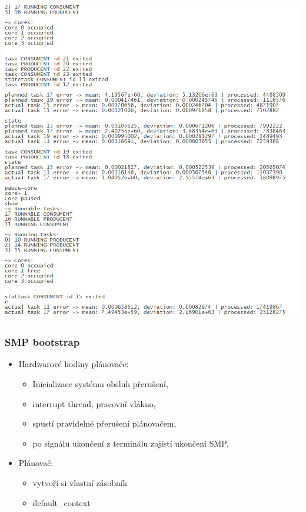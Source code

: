 \documentclass{beamer}
\begin{document}
\begin{frame} 
\includegraphics[height=\textheight]{obrazky/screen.png}

\end{frame}

\begin{frame}
\frametitle{SMP bootstrap}

\begin{itemize}
\item Hardwarové hodiny plánovače:
\begin{itemize}
  \item Inicializace systému obsluh přerušení,
  \item interrupt thread, pracovní vlákno,
  \item spustí pravidelné přerušení plánovačem,
  \item po signálu ukončení z terminálu zajistí ukončení SMP.
\end{itemize}

\item Plánovač:
\begin{itemize}
  \item vytvoří si vlastní zásobník
  \item default\_context
\end{itemize}
\end{itemize}
\end{frame}
\end{document}
